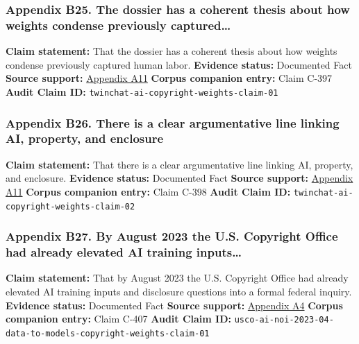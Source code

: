 \documentclass[
  american,
  11pt,
  letterpaper,
]{article}
\begin{document}
\subsubsection{Appendix B25. The dossier has a coherent thesis about how
weights condense previously
captured\ldots{}}\label{ch-04-appendix-b25-the-dossier-has-a-coherent-thesis-about-how-weights-condense-previously-captured}

\textbf{Claim statement:} That the dossier has a coherent thesis about
how weights condense previously captured human labor. \textbf{Evidence
status:} Documented Fact \textbf{Source support:}
\hyperref[ch-04-appendix-a11-ai-copyright-weights-a-new-frontier-in-intellectual-property-law]{Appendix
A11} \textbf{Corpus companion entry:} Claim C-397 \textbf{Audit Claim
ID:} \texttt{twinchat-ai-copyright-weights-claim-01}

\subsubsection{Appendix B26. There is a clear argumentative line linking
AI, property, and
enclosure}\label{ch-04-appendix-b26-there-is-a-clear-argumentative-line-linking-ai-property-and-enclosure}

\textbf{Claim statement:} That there is a clear argumentative line
linking AI, property, and enclosure. \textbf{Evidence status:}
Documented Fact \textbf{Source support:}
\hyperref[ch-04-appendix-a11-ai-copyright-weights-a-new-frontier-in-intellectual-property-law]{Appendix
A11} \textbf{Corpus companion entry:} Claim C-398 \textbf{Audit Claim
ID:} \texttt{twinchat-ai-copyright-weights-claim-02}

\subsubsection{Appendix B27. By August 2023 the U.S. Copyright Office
had already elevated AI training
inputs\ldots{}}\label{ch-04-appendix-b27-by-august-2023-the-u-s-copyright-office-had-already-elevated-ai-training-inputs}

\textbf{Claim statement:} That by August 2023 the U.S. Copyright Office
had already elevated AI training inputs and disclosure questions into a
formal federal inquiry. \textbf{Evidence status:} Documented Fact
\textbf{Source support:}
\hyperref[ch-04-appendix-a4-copyright-and-artificial-intelligence-notice-of-inquiry]{Appendix
A4} \textbf{Corpus companion entry:} Claim C-407 \textbf{Audit Claim
ID:}
\texttt{usco-ai-noi-2023-04-data-to-models-copyright-weights-claim-01}
\end{document}
